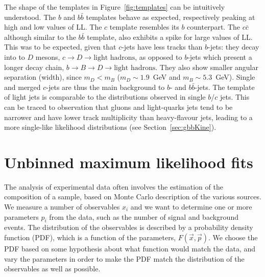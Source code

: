 The shape of the templates in Figure~\ref{fig:templates} can be intuitively understood. The $b$ and $b\bar{b}$ templates behave as expected, respectively peaking at high and low values of LL. The $c$ template resembles its $b$ counterpart. The $c\bar{c}$ although similar to the $b\bar{b}$ template, also exhibits a spike for large values of LL.  
This was to be expected, given that $c$-jets have less tracks than $b$-jets: they decay into to $D$ mesons, $c \rightarrow D \rightarrow \mbox{light hadrons}$, as opposed to $b$-jets which present a longer decay chain, $b \rightarrow B \rightarrow D\rightarrow \mbox{light hadrons}$. They also show smaller angular separation (width), since $m_D < m_B$  ($m_D\sim 1.9$~GeV and $m_B \sim 5.3$~GeV).
Single and merged $c$-jets are thus the main background to $b$- and $b\bar{b}$-jets. The template of light jets  %
is comparable to the distributions observed in single $b$/$c$ jets. This can be traced to observation that gluons and light-quarks jets tend to be narrower and have lower track multiplicity than heavy-flavour jets, leading to a more single-like likelihood distributions (see Section~\ref{sec:gbbKine}).



\section{Unbinned maximum likelihood fits}\label{sec:LLFits}

The analysis of experimental data often involves the estimation of the composition of a sample, based on Monte Carlo description of the various sources. We measure a number of observables $x_i$ and we want to determine one or more parameters $p_i$ from the data, such as the number of signal and background events. The distribution  of the observables is described by a probability density function (PDF), which is a function of %
the parameters, $F(\vec{x},\vec{p})$.  We choose the PDF based on some hypothesis about what function would match the data, and vary the parameters in order to make the PDF match the distribution of the observables as well as possible. 


